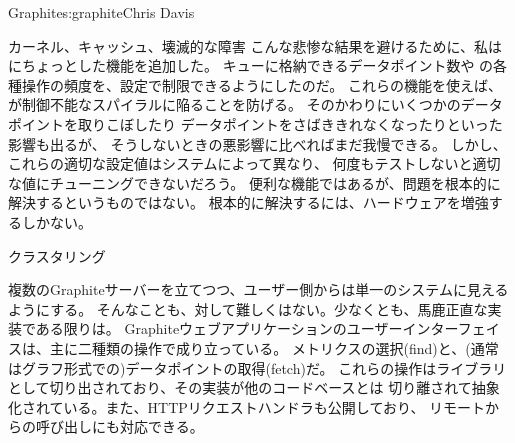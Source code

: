 \begin{aosachapter}{Graphite}{s:graphite}{Chris Davis}
\begin{aosasect1}{カーネル、キャッシュ、壊滅的な障害}
こんな悲惨な結果を避けるために、私はにちょっとした機能を追加した。
キューに格納できるデータポイント数や
の各種操作の頻度を、設定で制限できるようにしたのだ。
これらの機能を使えば、が制御不能なスパイラルに陥ることを防げる。
そのかわりにいくつかのデータポイントを取りこぼしたり
データポイントをさばききれなくなったりといった影響も出るが、
そうしないときの悪影響に比べればまだ我慢できる。
しかし、これらの適切な設定値はシステムによって異なり、
何度もテストしないと適切な値にチューニングできないだろう。
便利な機能ではあるが、問題を根本的に解決するというものではない。
根本的に解決するには、ハードウェアを増強するしかない。

\end{aosasect1}

\begin{aosasect1}{クラスタリング}

複数のGraphiteサーバーを立てつつ、ユーザー側からは単一のシステムに見えるようにする。
そんなことも、対して難しくはない。少なくとも、馬鹿正直な実装である限りは。
Graphiteウェブアプリケーションのユーザーインターフェイスは、主に二種類の操作で成り立っている。
メトリクスの選択(find)と、(通常はグラフ形式での)データポイントの取得(fetch)だ。
これらの操作はライブラリとして切り出されており、その実装が他のコードベースとは
切り離されて抽象化されている。また、HTTPリクエストハンドラも公開しており、
リモートからの呼び出しにも対応できる。


\end{aosasect1}
\end{aosachapter}
